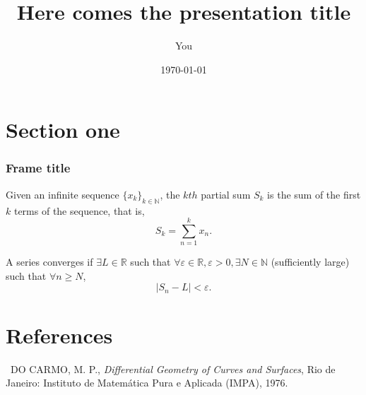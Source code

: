 \documentclass{beamer}
\title{Here comes the presentation title}
\author{You}
\date{\today}
\institute{Universidade Federal de Santa Catarina}
\begin{document}
{ 
\frame{\titlepage}}
\frame{\tableofcontents}


\section{Section one}    
\begin{frame}
\tableofcontents[currentsection]
\end{frame}


\begin{frame}
\frametitle{Frame title}

\begin{definition}
	Given an infinite sequence $\{x_k\}_{k \in \mathbb{N}}$, the $kth$ partial sum $S_k$ is the sum of the first $k$ terms of the sequence, that is, $$S_k = \sum_{n = 1}^{k} x_n.$$
\end{definition} \pause %

\begin{definition}
	A series converges if $\exists L \in \mathbb{R}$  such that $\forall \varepsilon \in \mathbb{R}, \varepsilon > 0, \exists N \in \mathbb{N}$ (sufficiently large) such that $\forall n \geq  N$,  $$\vert S_n - L \vert < \varepsilon.$$
\end{definition}
\end{frame}




\section{References}
\begin{frame}
\tableofcontents[currentsection]
\end{frame}

\begin{thebibliography}{1}
	
	~DO CARMO, M. P., \emph{Differential Geometry of Curves and Surfaces}, Rio de Janeiro: Instituto de Matemática Pura e Aplicada (IMPA), 1976.	
	
\end{thebibliography}
\end{document}
